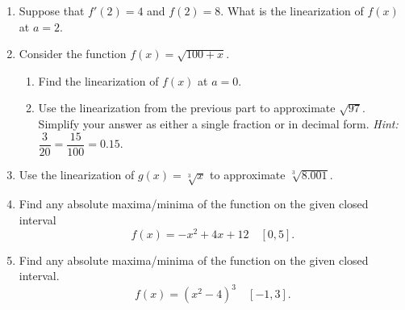 \documentclass[12pt]{article}
\begin{document}
 
\begin{enumerate}
    \item Suppose that $f'(2) = 4$ and $f(2) = 8$. What is the linearization of $f(x)$ at $a=2$.
    \vspace{2in}

    \item Consider the function $f(x) = \sqrt{100+x}.$

\begin{enumerate}
    \item Find the linearization of $f(x)$ at $a=0.$
    \vspace{2in}
    \item Use the linearization from the previous part to approximate $\sqrt{97}$. Simplify your answer as either a single fraction or in decimal form. \emph{Hint:} $\dfrac{3}{20} = \dfrac{15}{100} = 0.15$. 
    \vfill
\end{enumerate}

\pagebreak

    \item Use the linearization of $g(x) = \sqrt[3]{x}$ to approximate $\sqrt[3]{8.001}$. 
    \vfill
\clearpage

    \item Find any absolute maxima/minima of the function on the given closed interval $$f(x) = -x^2+4x+12 \quad [0,5].$$

    \vfill
    
    \item Find any absolute maxima/minima of the function on the given closed interval.
    $$f(x) = (x^2-4)^3 \quad [-1,3].$$
    
    \vfill
\end{enumerate}
\end{document}
